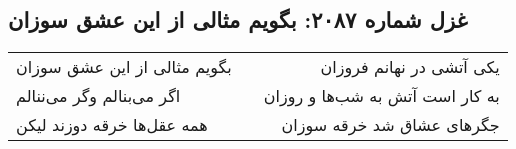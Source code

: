 \begin{center}
\section*{غزل شماره ۲۰۸۷: بگویم مثالی از این عشق سوزان}
\label{sec:2087}
\begin{longtable}{l p{0.5cm} r}
بگویم مثالی از این عشق سوزان
&&
یکی آتشی در نهانم فروزان
\\
اگر می‌بنالم وگر می‌ننالم
&&
به کار است آتش به شب‌ها و روزان
\\
همه عقل‌ها خرقه دوزند لیکن
&&
جگرهای عشاق شد خرقه سوزان
\\
\end{longtable}
\end{center}
